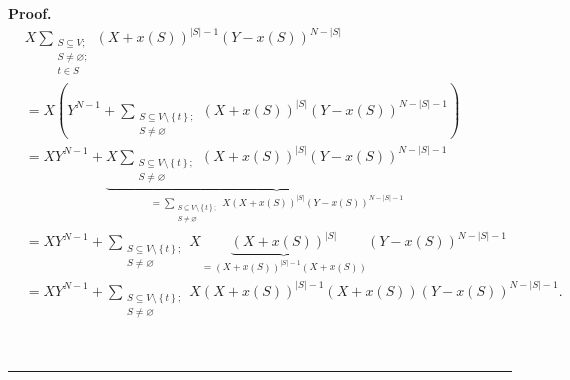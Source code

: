 \documentclass[numbers=enddot,12pt,final,onecolumn,notitlepage]{scrartcl}%
\theoremstyle{definition}
\newenvironment{proof}[1][Proof]{\noindent\textbf{#1.} }{\ \rule{0.5em}{0.5em}}
\let\sumnonlimits\sum
\renewcommand{\sum}{\sumnonlimits\limits}
\newenvironment{verlong}{}{}
\begin{document}
\begin{verlong}
\begin{proof}
\begin{align}
&  X\sum_{\substack{S\subseteq V;\\S\neq\varnothing;\\t\in S}}\left(
X+x\left(  S\right)  \right)  ^{\left\vert S\right\vert -1}\left(  Y-x\left(
S\right)  \right)  ^{N-\left\vert S\right\vert }\nonumber\\
&  =X\left(  Y^{N-1}+\sum_{\substack{S\subseteq V\setminus\left\{  t\right\}
;\\S\neq\varnothing}}\left(  X+x\left(  S\right)  \right)  ^{\left\vert
S\right\vert }\left(  Y-x\left(  S\right)  \right)  ^{N-\left\vert
S\right\vert -1}\right) \nonumber\\
&  =XY^{N-1}+\underbrace{X\sum_{\substack{S\subseteq V\setminus\left\{
t\right\}  ;\\S\neq\varnothing}}\left(  X+x\left(  S\right)  \right)
^{\left\vert S\right\vert }\left(  Y-x\left(  S\right)  \right)
^{N-\left\vert S\right\vert -1}}_{=\sum_{\substack{S\subseteq V\setminus
\left\{  t\right\}  ;\\S\neq\varnothing}}X\left(  X+x\left(  S\right)
\right)  ^{\left\vert S\right\vert }\left(  Y-x\left(  S\right)  \right)
^{N-\left\vert S\right\vert -1}}\nonumber\\
&  =XY^{N-1}+\sum_{\substack{S\subseteq V\setminus\left\{  t\right\}
;\\S\neq\varnothing}}X\underbrace{\left(  X+x\left(  S\right)  \right)
^{\left\vert S\right\vert }}_{=\left(  X+x\left(  S\right)  \right)
^{\left\vert S\right\vert -1}\left(  X+x\left(  S\right)  \right)  }\left(
Y-x\left(  S\right)  \right)  ^{N-\left\vert S\right\vert -1}\nonumber\\
&  =XY^{N-1}+\sum_{\substack{S\subseteq V\setminus\left\{  t\right\}
;\\S\neq\varnothing}}X\left(  X+x\left(  S\right)  \right)  ^{\left\vert
S\right\vert -1}\left(  X+x\left(  S\right)  \right)  \left(  Y-x\left(
S\right)  \right)  ^{N-\left\vert S\right\vert -1}.
\label{pf.lem.12.step.sum1}%
\end{align}



\end{proof}
\end{verlong}
\end{document}
